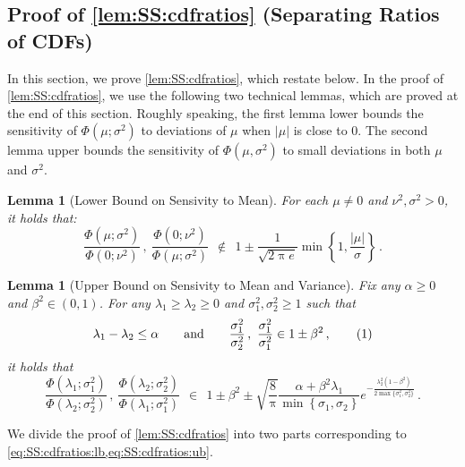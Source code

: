 \documentclass[11pt,letterpaper]{article}
\theoremstyle{plain}
\newtheorem{lemma}[theorem]{Lemma}
\theoremstyle{definition}
\theoremstyle{remark}
\newcommand{\yesnum}{\addtocounter{equation}{1}\tag{\theequation}}
\newcommand{\qquadtext}[1]{\qquad\text{#1}\qquad}
\newcommand{\qquadand}{\qquadtext{and}}
\def\abs#1{\left| #1 \right|}
\newcommand{\sinbrace}[1]{\ensuremath{\{#1\}}}
\newcommand{\inbrace}[1]{\ensuremath{\left\{#1\right\}}}
\newcommand{\inparen}[1]{\ensuremath{\left(#1\right)}}
\renewcommand{\pi}{\uppi}
\begin{document}
{{{        \subsection{Proof of \cref{lem:SS:cdfratios} (Separating Ratios of CDFs)}
            \label{sec:proofof:lem:SS:cdfratios}
            In this section, we prove \cref{lem:SS:cdfratios}, which restate below.
            \lemSScdfratios*
            \noindent In the proof of \cref{lem:SS:cdfratios}, we use the following two technical lemmas, which are proved at the end of this section.
            Roughly speaking, the first lemma lower bounds the sensitivity of $\Phi(\mu;\sigma^2)$ to deviations of $\mu$ when $\abs{\mu}$ is close to 0.
            The second lemma upper bounds the sensitivity of $\Phi(\mu,\sigma^2)$ to small deviations in both $\mu$ and $\sigma^2$.
            \begin{lemma}[Lower Bound on Sensivity to Mean]\label{lem:SS:cdfRatiosLB}
                For each $\mu\neq 0$ and $\nu^2,\sigma^2 > 0$, it holds that:
                \[
                    \frac{
                        \Phi\inparen{\mu; \sigma^2}
                    }{
                        \Phi\inparen{0; \nu^2}
                    }\,,~ 
                    \frac{
                        \Phi\inparen{0; \nu^2}
                    }{
                        \Phi\inparen{\mu; \sigma^2}
                    }
                    ~~\notin~~ 
                    1\pm \frac{1}{\sqrt{2\pi e}}
                    \min\inbrace{1, \frac{\abs{\mu}}{\sigma}}
                    \,.  %
                \]
            \end{lemma}
            \vspace{-5mm}
            \begin{lemma}[Upper Bound on Sensivity to Mean and Variance]\label{lem:SS:cdfRatiosUB}
                Fix any $\alpha\geq 0$ and $\beta^2\in(0,1)$.
                For any $\lambda_1 \geq \lambda_2\geq 0$ and $\sigma_1^2,\sigma_2^2\geq 1$ such that 
                \[
                    \lambda_1 - \lambda_2 \leq \alpha
                    \qquadand
                    \frac{\sigma_1^2}{\sigma_2^2}\,,~\frac{\sigma_1^2}{\sigma_1^2} \in 1\pm \beta^2
                    \,,
                    \yesnum\label{eq:SS:cdfRatiosUB:assumption}
                \]
                it holds that 
                \[
                    \frac{
                        \Phi\inparen{\lambda_1; \sigma_1^2}
                    }{
                        \Phi\inparen{\lambda_2; \sigma_2^2}
                    }\,,~ 
                    \frac{
                        \Phi\inparen{\lambda_2; \sigma_2^2}
                    }{
                        \Phi\inparen{\lambda_1; \sigma_1^2}
                    }
                    ~~\in~~ 
                    1\pm \beta^2 
                    \pm
                        \sqrt{\frac{8}{\pi}}\frac{\alpha+\beta^2\lambda_1}{\min\inbrace{\sigma_1,\sigma_2}}
                        e^{-\frac{\lambda_2^2(1-\beta^2)}{2\max\sinbrace{\sigma_1^2,\sigma_2^2}}}
                        \,.
                \]
            \end{lemma}
            We divide the proof of \cref{lem:SS:cdfratios} into two parts corresponding to \cref{eq:SS:cdfratios:lb,eq:SS:cdfratios:ub}.
            
}}}
\end{document}
